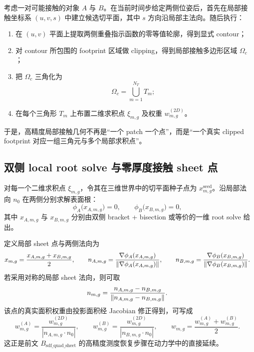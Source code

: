 \documentclass[12pt,a4paper]{ctexart}
\begin{document}
考虑一对可能接触的对象 $A$ 与 $B$。在当前时间步给定两侧位姿后，首先在局部接触坐标系 $(u,v,s)$ 中建立候选切平面，其中 $s$ 方向沿局部主法向。随后执行：
\begin{enumerate}
    \item 在 $(u,v)$ 平面上提取两侧重叠指示函数的零等值轮廓，得到显式 contour；
    \item 对 contour 所包围的 footprint 区域做 clipping，得到局部接触多边形区域 $\Omega_c$；
    \item 把 $\Omega_c$ 三角化为
    \begin{equation}
        \Omega_c = \bigcup_{m=1}^{N_T} T_m;
    \end{equation}
    \item 在每个三角形 $T_m$ 上布置二维求积点 $\xi_{m,g}$ 及权重 $w_{m,g}^{(2D)}$。
\end{enumerate}
于是，高精度局部接触几何不再是“一个 patch 一个点”，而是“一个真实 clipped footprint 对应一组三角元与多个局部求积点”。

\subsection{双侧 local root solve 与零厚度接触 sheet 点}

对每一个二维求积点 $\xi_{m,g}$，令其在三维世界中的切平面种子点为 $x_{m,g}^{\mathrm{seed}}$。沿局部法向 $n_0$ 在两侧分别求解表面根：
\begin{equation}
    \phi_A\!\bigl(x_{A,m,g}\bigr)=0,
    \qquad
    \phi_B\!\bigl(x_{B,m,g}\bigr)=0,
\end{equation}
其中 $x_{A,m,g}$ 与 $x_{B,m,g}$ 分别由双侧 bracket + bisection 或等价的一维 root solve 给出。

定义局部 sheet 点与两侧法向为
\begin{equation}
    x_{m,g} = \frac{x_{A,m,g}+x_{B,m,g}}{2},
    \qquad
    n_{A,m,g}=\frac{\nabla \phi_A(x_{A,m,g})}{\norm{\nabla \phi_A(x_{A,m,g})}},
    \qquad
    n_{B,m,g}=\frac{\nabla \phi_B(x_{B,m,g})}{\norm{\nabla \phi_B(x_{B,m,g})}}.
\end{equation}
若采用对称的局部 sheet 法向，则可取
\begin{equation}
    n_{m,g}=\frac{n_{A,m,g}-n_{B,m,g}}{\norm{n_{A,m,g}-n_{B,m,g}}}.
\end{equation}
该点的真实面积权重由投影面积经 Jacobian 修正得到，可写成
\begin{equation}
    w^{(A)}_{m,g} = \frac{w_{m,g}^{(2D)}}{|n_{A,m,g}\cdot n_0|},
    \qquad
    w^{(B)}_{m,g} = \frac{w_{m,g}^{(2D)}}{|n_{B,m,g}\cdot n_0|},
    \qquad
    w_{m,g}=\frac{w^{(A)}_{m,g}+w^{(B)}_{m,g}}{2}.
\end{equation}
这正是前文 $B_{\mathrm{sdf\_quad\_sheet}}$ 的高精度测度恢复步骤在动力学中的直接延续。
\end{document}
